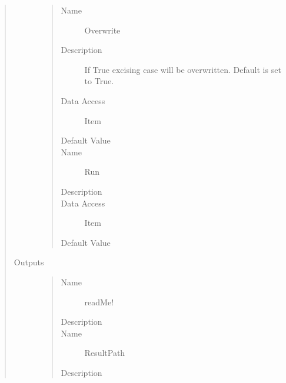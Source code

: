 \documentclass[letterpaper,10pt,english]{sphinxmanual}
\begin{document}
\begin{quote}
\begin{description}
\begin{quote}
\begin{description}
\item[{Name}] \leavevmode
Overwrite

\item[{Description}] \leavevmode
If True excising case will be overwritten. Default is set to True.

\item[{Data Access}] \leavevmode
Item

\item[{Default Value}] \leavevmode
{}

\item[{Name}] \leavevmode
Run

\item[{Description}] \leavevmode
{}

\item[{Data Access}] \leavevmode
Item

\item[{Default Value}] \leavevmode
{}

\end{description}\end{quote}

\item[{Outputs}] \leavevmode\begin{quote}\begin{description}
\item[{Name}] \leavevmode
readMe!

\item[{Description}] \leavevmode
{}

\item[{Name}] \leavevmode
ResultPath

\item[{Description}] \leavevmode
{}

\end{description}\end{quote}

\end{description}\end{quote}
\end{document}
